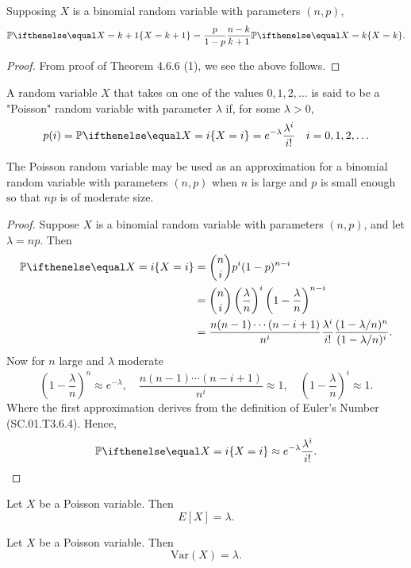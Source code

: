 \documentclass[a4paper,8pt]{article}
\begin{document}
\begin{outline}
    Supposing \(X\) is a binomial random variable with parameters \((n,p)\),
    \[ \bbp[X=k+1] = \frac{p}{1-p}\frac{n-k}{k+1}\bbp[X=k]\text{.} \]

    \begin{proof}
      From proof of Theorem 4.6.6 (1), we see the above follows.
    \end{proof}

    A random variable \(X\) that takes on one of the values \(0, 1, 2, \ldots\) is said to be a
    "Poisson" random variable with parameter \(\lambda\) if, for some \(\lambda > 0\), \[ p(i) = \bbp[X=i]
    = e^{-\lambda}\frac{\lambda^i}{i!}\quad i=0,1,2,\ldots \]

      The Poisson random variable may be used as an approximation for a binomial random variable with
      parameters \((n,p)\) when \(n\) is large and \(p\) is small enough so that \(np\) is of moderate size.

      \begin{proof}
        Suppose \(X\) is a binomial random variable with parameters \((n,p)\), and let \(\lambda = np\). Then
        \begin{align*}
          \bbp[X=i] &= \binom{n}{i}p^i(1-p)^{n-i} \\
                    &= \binom{n}{i}\left(\frac{\lambda}{n}\right)^i\left(1-\frac{\lambda}{n}\right)^{n-i} \\
                    &= \frac{n(n-1)\cdots(n-i+1)}{n^i}\frac{\lambda^i}{i!}\frac{(1-\lambda/n)^n}{(1-\lambda/n)^i}\text{.}
        \end{align*}
        Now for \(n\) large and \(\lambda\) moderate
        \[
          \left(1-\frac{\lambda}{n}\right)^n \approx e^{-\lambda},\quad
          \frac{n(n-1)\cdots(n-i+1)}{n^i}\approx 1,\quad
          \left(1-\frac{\lambda}{n}\right)^i \approx 1\text{.}
        \]
        Where the first approximation derives from the definition of Euler's Number (SC.01.T3.6.4). Hence,
        \[\bbp[X=i] \approx e^{-\lambda}\frac{\lambda^i}{i!}\text{.} \]
      \end{proof}

    Let \(X\) be a Poisson variable. Then \[E[X] = \lambda\text{.}\]

    Let \(X\) be a Poisson variable. Then \[\text{Var}(X) = \lambda\text{.}\]


\end{outline}
\end{document}
